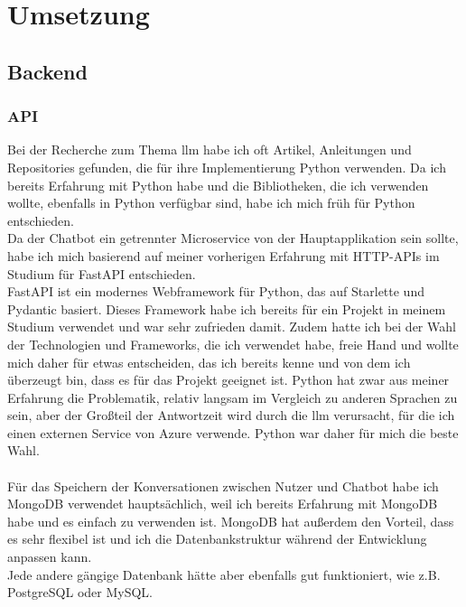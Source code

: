 \chapter{Umsetzung}\label{ch:umsetzung}
\section{Backend}\label{sec:umsetzung_backend}
\subsection{API}\label{sec:umsetzung_api}
Bei der Recherche zum Thema \gls{llm} habe ich oft Artikel, Anleitungen und Repositories gefunden, die für ihre Implementierung Python verwenden.  
Da ich bereits Erfahrung mit Python habe und die Bibliotheken, die ich verwenden wollte, ebenfalls in Python verfügbar sind, habe ich mich früh für Python entschieden.\\  
Da der Chatbot ein getrennter Microservice von der Hauptapplikation sein sollte, habe ich mich basierend auf meiner vorherigen Erfahrung mit HTTP-APIs im Studium für FastAPI entschieden.\\  
FastAPI ist ein modernes Webframework für Python, das auf Starlette und Pydantic basiert.  
Dieses Framework habe ich bereits für ein Projekt in meinem Studium verwendet und war sehr zufrieden damit.  
Zudem hatte ich bei der Wahl der Technologien und Frameworks, die ich verwendet habe, freie Hand und wollte  
mich daher für etwas entscheiden, das ich bereits kenne und von dem ich überzeugt bin, dass es für das Projekt geeignet ist.  
Python hat zwar aus meiner Erfahrung die Problematik, relativ langsam im Vergleich zu anderen Sprachen zu sein, aber der Großteil der Antwortzeit wird durch die \gls{llm} verursacht,  
für die ich einen externen Service von Azure verwende. Python war daher für mich die beste Wahl.\\\\  
Für das Speichern der Konversationen zwischen Nutzer und Chatbot habe ich MongoDB verwendet hauptsächlich, weil ich bereits Erfahrung mit MongoDB habe und es einfach zu verwenden ist.  
MongoDB hat außerdem den Vorteil, dass es sehr flexibel ist und ich die Datenbankstruktur während der Entwicklung anpassen kann.\\  
Jede andere gängige Datenbank hätte aber ebenfalls gut funktioniert, wie z.B. PostgreSQL oder MySQL.\\

